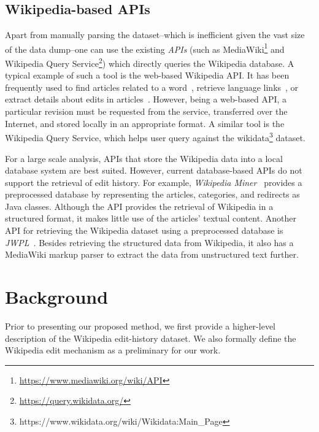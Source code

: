 \documentclass[acmsmall]{acmart}
\begin{document}
\subsection{Wikipedia-based APIs}
Apart from manually parsing the dataset--which is inefficient given the vast size of the data dump--one can use the existing \emph{APIs} (such as MediaWiki\footnote{\url{https://www.mediawiki.org/wiki/API}} and Wikipedia Query Service\footnote{\url{https://query.wikidata.org/}}) which directly queries the Wikipedia database. A typical example of such a tool is the web-based Wikipedia API. It has been frequently used to find articles related to a word~\cite{wu2015sense}, retrieve language links~\cite{steiner2013mj}, or extract details about edits in articles~\cite{boukhelifa2010real}. However, being a web-based API, a particular revision must be requested from the service, transferred over the Internet, and stored locally in an appropriate format. A similar tool is the Wikipedia Query Service, which helps user query against the wikidata\footnote{https://www.wikidata.org/wiki/Wikidata:Main\_Page} dataset.

For a large scale analysis, APIs that store the Wikipedia data into a local database system are best suited. However, current database-based APIs do not support the retrieval of edit history. For example, \emph{Wikipedia Miner}~\cite{milne2013open} provides a preprocessed database by representing the articles, categories, and redirects as Java classes. Although the API provides the retrieval of Wikipedia in a structured format, it makes little use of the articles' textual content. Another API for retrieving the Wikipedia dataset using a preprocessed database is \emph{JWPL}~\cite{zesch2008extracting}. Besides retrieving the structured data from Wikipedia, it also has a MediaWiki markup parser to extract the data from unstructured text further.



\section{Background}
Prior to presenting our proposed method, we first provide a higher-level description of the Wikipedia edit-history dataset. We also formally define the Wikipedia edit mechanism as a preliminary for our work.
\end{document}
